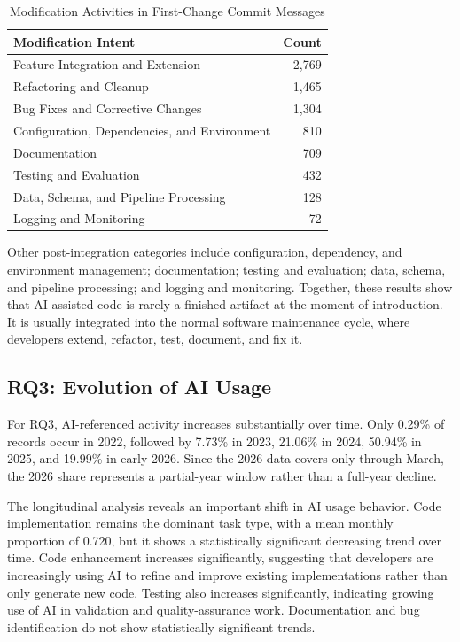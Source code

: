 \documentclass[12pt,draftclsnofoot,onecolumn]{IEEEtran}
\begin{document}
\begin{table}[!t]
\caption{Modification Activities in First-Change Commit Messages}
\label{tab:first_change}
\centering
\small
\begin{tabularx}{0.86\linewidth}{Xr}
\toprule
\textbf{Modification Intent} & \textbf{Count} \\
\midrule
Feature Integration and Extension & 2,769 \\
Refactoring and Cleanup & 1,465 \\
Bug Fixes and Corrective Changes & 1,304 \\
Configuration, Dependencies, and Environment & 810 \\
Documentation & 709 \\
Testing and Evaluation & 432 \\
Data, Schema, and Pipeline Processing & 128 \\
Logging and Monitoring & 72 \\
\bottomrule
\end{tabularx}
\end{table}

Other post-integration categories include configuration, dependency, and environment management; documentation; testing and evaluation; data, schema, and pipeline processing; and logging and monitoring. Together, these results show that AI-assisted code is rarely a finished artifact at the moment of introduction. It is usually integrated into the normal software maintenance cycle, where developers extend, refactor, test, document, and fix it.

\subsection{RQ3: Evolution of AI Usage}

For RQ3, AI-referenced activity increases substantially over time. Only 0.29\% of records occur in 2022, followed by 7.73\% in 2023, 21.06\% in 2024, 50.94\% in 2025, and 19.99\% in early 2026. Since the 2026 data covers only through March, the 2026 share represents a partial-year window rather than a full-year decline.

The longitudinal analysis reveals an important shift in AI usage behavior. Code implementation remains the dominant task type, with a mean monthly proportion of 0.720, but it shows a statistically significant decreasing trend over time. Code enhancement increases significantly, suggesting that developers are increasingly using AI to refine and improve existing implementations rather than only generate new code. Testing also increases significantly, indicating growing use of AI in validation and quality-assurance work. Documentation and bug identification do not show statistically significant trends.
\end{document}

